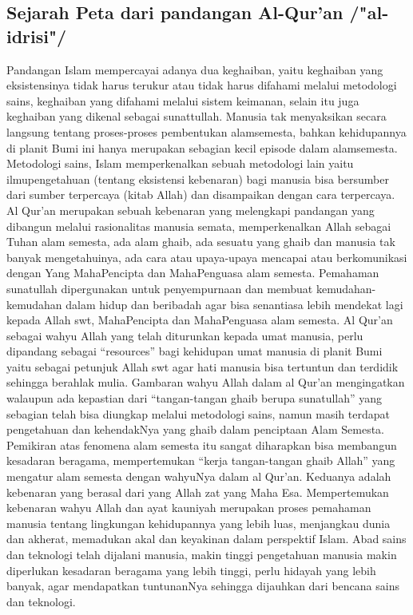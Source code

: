 \subsection {Sejarah Peta dari pandangan Al-Qur'an /"al-idrisi"/}
	Pandangan Islam mempercayai adanya dua keghaiban, yaitu keghaiban yang eksistensinya tidak harus terukur atau tidak harus difahami melalui metodologi sains, keghaiban yang difahami melalui sistem keimanan, selain itu juga keghaiban yang dikenal sebagai sunattullah. Manusia tak menyaksikan secara langsung tentang proses-proses pembentukan alamsemesta, bahkan kehidupannya di planit Bumi ini hanya merupakan sebagian kecil episode dalam alamsemesta.
	Metodologi sains, Islam memperkenalkan sebuah metodologi lain yaitu ilmupengetahuan (tentang eksistensi kebenaran) bagi manusia bisa bersumber dari sumber terpercaya (kitab Allah) dan disampaikan dengan cara terpercaya. Al Qur’an merupakan sebuah kebenaran yang melengkapi pandangan yang dibangun melalui rasionalitas manusia semata, memperkenalkan Allah sebagai Tuhan alam semesta, ada alam ghaib, ada sesuatu yang ghaib dan manusia tak banyak mengetahuinya, ada cara atau upaya-upaya mencapai atau berkomunikasi dengan Yang MahaPencipta dan MahaPenguasa alam semesta. Pemahaman sunatullah dipergunakan untuk penyempurnaan dan membuat kemudahan-kemudahan dalam hidup dan beribadah agar bisa senantiasa lebih mendekat lagi kepada Allah swt, MahaPencipta dan MahaPenguasa alam semesta.
	Al Qur’an sebagai wahyu Allah yang telah diturunkan kepada umat manusia, perlu dipandang sebagai “resources” bagi kehidupan umat manusia di planit Bumi yaitu sebagai petunjuk Allah swt agar hati manusia bisa tertuntun dan terdidik sehingga berahlak mulia. Gambaran wahyu Allah dalam al Qur'an mengingatkan walaupun ada kepastian dari “tangan-tangan ghaib berupa sunatullah” yang sebagian telah bisa diungkap melalui metodologi sains, namun masih terdapat pengetahuan dan kehendakNya yang ghaib dalam penciptaan Alam Semesta. 
	Pemikiran atas fenomena alam semesta itu sangat diharapkan bisa membangun kesadaran beragama, mempertemukan “kerja tangan-tangan ghaib Allah” yang mengatur alam semesta dengan wahyuNya dalam al Qur’an. Keduanya adalah kebenaran yang berasal dari yang Allah zat yang Maha Esa. Mempertemukan kebenaran wahyu Allah dan ayat kauniyah merupakan proses pemahaman manusia tentang lingkungan kehidupannya yang lebih luas, menjangkau dunia dan akherat, memadukan akal dan keyakinan dalam perspektif Islam. 
	Abad sains dan teknologi telah dijalani manusia, makin tinggi pengetahuan manusia makin diperlukan kesadaran beragama yang lebih tinggi, perlu hidayah yang lebih banyak, agar mendapatkan tuntunanNya sehingga dijauhkan dari bencana sains dan teknologi. 
